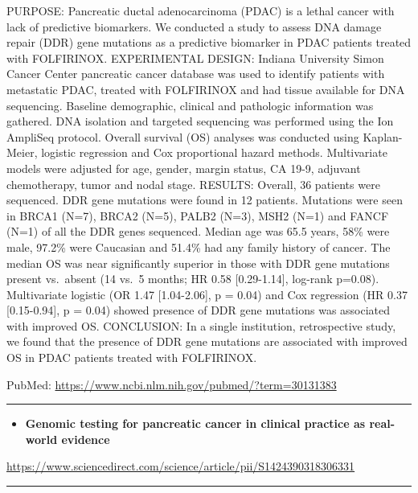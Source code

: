 \documentclass[]{article}
\providecommand{\tightlist}{%
  \setlength{\itemsep}{0pt}\setlength{\parskip}{0pt}}
\begin{document}
PURPOSE: Pancreatic ductal adenocarcinoma (PDAC) is a lethal cancer with
lack of predictive biomarkers. We conducted a study to assess DNA damage
repair (DDR) gene mutations as a predictive biomarker in PDAC patients
treated with FOLFIRINOX. EXPERIMENTAL DESIGN: Indiana University Simon
Cancer Center pancreatic cancer database was used to identify patients
with metastatic PDAC, treated with FOLFIRINOX and had tissue available
for DNA sequencing. Baseline demographic, clinical and pathologic
information was gathered. DNA isolation and targeted sequencing was
performed using the Ion AmpliSeq protocol. Overall survival (OS)
analyses was conducted using Kaplan-Meier, logistic regression and Cox
proportional hazard methods. Multivariate models were adjusted for age,
gender, margin status, CA 19-9, adjuvant chemotherapy, tumor and nodal
stage. RESULTS: Overall, 36 patients were sequenced. DDR gene mutations
were found in 12 patients. Mutations were seen in BRCA1 (N=7), BRCA2
(N=5), PALB2 (N=3), MSH2 (N=1) and FANCF (N=1) of all the DDR genes
sequenced. Median age was 65.5 years, 58\% were male, 97.2\% were
Caucasian and 51.4\% had any family history of cancer. The median OS was
near significantly superior in those with DDR gene mutations present
vs.~absent (14 vs.~5 months; HR 0.58 {[}0.29-1.14{]}, log-rank p=0.08).
Multivariate logistic (OR 1.47 {[}1.04-2.06{]}, p = 0.04) and Cox
regression (HR 0.37 {[}0.15-0.94{]}, p = 0.04) showed presence of DDR
gene mutations was associated with improved OS. CONCLUSION: In a single
institution, retrospective study, we found that the presence of DDR gene
mutations are associated with improved OS in PDAC patients treated with
FOLFIRINOX.

PubMed: \url{https://www.ncbi.nlm.nih.gov/pubmed/?term=30131383}

{}

{}

\begin{center}\rule{0.5\linewidth}{\linethickness}\end{center}

\begin{itemize}
\tightlist
\item
  \textbf{Genomic testing for pancreatic cancer in clinical practice as
  real-world evidence}
\end{itemize}

\url{https://www.sciencedirect.com/science/article/pii/S1424390318306331}

\begin{center}\rule{0.5\linewidth}{\linethickness}\end{center}
\end{document}
